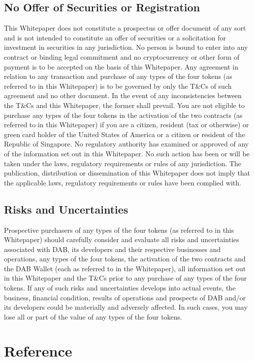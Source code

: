 \documentclass[review]{elsarticle}
\begin{document}
\subsection{No Offer of Securities or Registration}
This Whitepaper does not constitute a prospectus or offer document of any sort and is not intended to constitute an offer of securities or a solicitation for investment in securities in any jurisdiction. No person is bound to enter into any contract or binding legal commitment and no cryptocurrency or other form of payment is to be accepted on the basis of this Whitepaper. Any agreement in relation to any transaction and purchase of any types of the four tokens (as referred to in this Whitepaper) is to be governed by only the T\&Cs of such agreement and no other document. In the event of any inconsistencies between the T\&Cs and this Whitepaper, the former shall prevail. 
You are not eligible to purchase any types of the four tokens in the activation of the two contracts (as referred to in this Whitepaper) if you are a citizen, resident (tax or otherwise) or green card holder of the United States of America or a citizen or resident of the Republic of Singapore. 
No regulatory authority has examined or approved of any of the information set out in this Whitepaper. No such action has been or will be taken under the laws, regulatory requirements or rules of any jurisdiction. The publication, distribution or dissemination of this Whitepaper does not imply that the applicable laws, regulatory requirements or rules have been complied with.

\subsection{Risks and Uncertainties}
Prospective purchasers of any types of the four tokens (as referred to in this Whitepaper) should carefully consider and evaluate all risks and uncertainties associated with DAB, its developers and their respective businesses and operations, any types of the four tokens, the activation of the two contracts and the DAB Wallet (each as referred to in the Whitepaper), all information set out in this Whitepaper and the T\&Cs prior to any purchase of any types of the four tokens. If any of such risks and uncertainties develops into actual events, the business, financial condition, results of operations and prospects of DAB and/or its developers could be materially and adversely affected. In such cases, you may lose all or part of the value of any types of the four tokens.

\section{Reference}



\end{document}
